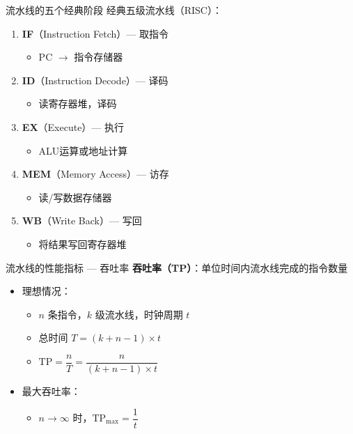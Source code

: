 \documentclass[10pt, aspectratio=169]{beamer}
\begin{document}
\begin{frame}[fragile]{流水线的五个经典阶段}
    经典五级流水线（RISC）：
    \vspace{0.3em}
    \begin{enumerate}
        \item \textbf{IF}（Instruction Fetch）--- 取指令
            \begin{itemize}
                \item PC $\rightarrow$ 指令存储器
            \end{itemize}
        \item \textbf{ID}（Instruction Decode）--- 译码
            \begin{itemize}
                \item 读寄存器堆，译码
            \end{itemize}
        \item \textbf{EX}（Execute）--- 执行
            \begin{itemize}
                \item ALU运算或地址计算
            \end{itemize}
        \item \textbf{MEM}（Memory Access）--- 访存
            \begin{itemize}
                \item 读/写数据存储器
            \end{itemize}
        \item \textbf{WB}（Write Back）--- 写回
            \begin{itemize}
                \item 将结果写回寄存器堆
            \end{itemize}
    \end{enumerate}
\end{frame}

\begin{frame}{流水线的性能指标 --- 吞吐率}
    \textbf{吞吐率（TP）}：单位时间内流水线完成的指令数量
    \vspace{0.3em}
    \begin{itemize}
        \item 理想情况：
            \begin{itemize}
                \item $n$ 条指令，$k$ 级流水线，时钟周期 $t$
                \item 总时间 $T = (k + n - 1) \times t$
                \item $\text{TP} = \dfrac{n}{T} = \dfrac{n}{(k + n - 1) \times t}$
            \end{itemize}
        \item 最大吞吐率：
            \begin{itemize}
                \item $n \rightarrow \infty$ 时，$\text{TP}_{\max} = \dfrac{1}{t}$
            \end{itemize}
    \end{itemize}
\end{frame}
\end{document}
